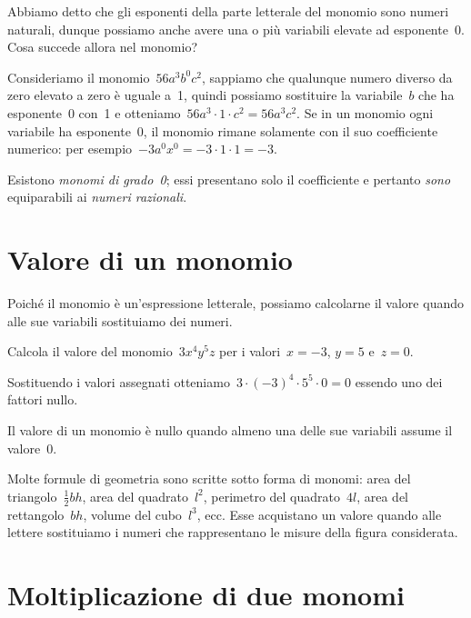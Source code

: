 Abbiamo detto che gli esponenti della parte letterale del monomio sono
numeri naturali, dunque possiamo anche avere una o più variabili
elevate ad esponente~0. Cosa succede allora nel monomio?

Consideriamo il monomio~$56a^{3}b^{0}c^{2}$, sappiamo che qualunque
numero diverso da zero elevato a zero è uguale a~1, quindi possiamo
sostituire la variabile~$b$ che ha esponente~0 con~1 e
otteniamo~$56a^{3}\cdot 1\cdot c^{2}=56a^{3}c^{2}$. Se in un monomio ogni
variabile ha esponente~0, il monomio rimane solamente con il suo
coefficiente numerico: per esempio~$-3a^{0}x^{0}=-3\cdot 1\cdot 1=-3$.

\osservazione Esistono \emph{monomi di grado~0}; essi presentano solo il
coefficiente e pertanto \emph{sono} equiparabili ai \emph{numeri razionali}.

\section{Valore di un monomio}

Poiché il monomio è un'espressione letterale,
possiamo calcolarne il valore quando alle sue variabili sostituiamo dei numeri.

\begin{exrig}
 \begin{esempio}
 Calcola il valore del monomio~$3x^{4}y^{5}z$ per i valori~$x=-3$, $y=5$ e~$z=0$.

Sostituendo i valori assegnati otteniamo~$3\cdot (-3)^{4}\cdot 5^{5}\cdot 0=0$ essendo uno dei fattori nullo.
 \end{esempio}
\end{exrig}

\osservazione Il valore di un monomio è nullo quando almeno una delle sue variabili
assume il valore~0.

Molte formule di geometria sono scritte sotto forma di monomi: area del
triangolo~$\frac{1}{2}bh$, area del quadrato~$l^{2}$,
perimetro del quadrato~$4l$, area del rettangolo~$bh$, volume del cubo~$l^{3}$, ecc.
Esse acquistano un valore quando alle lettere sostituiamo
i numeri che rappresentano le misure della figura considerata.

\ovalbox{\risolvii \ref{ese:10.3}, \ref{ese:10.4}, \ref{ese:10.5}, \ref{ese:10.6}, \ref{ese:10.7}, \ref{ese:10.8}, \ref{ese:10.9}, \ref{ese:10.10}, \ref{ese:10.11}}

\section{Moltiplicazione di due monomi}


